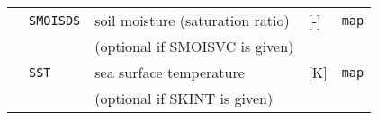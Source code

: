 {\begin{table}[bth]
\begin{center}
\begin{tabularx}{150mm}{rl|l|l|X}
           &\verb|SMOISDS| & soil moisture (saturation ratio) & [-]            & \verb|map|         \\
           &               & (optional if SMOISVC is given)   &                &                    \\
           &\verb|SST|     & sea surface temperature          & [K]            & \verb|map|         \\
           &               & (optional if SKINT is given)     &                &                    \\\hline
\end{tabularx}
\end{center}
\end{table}
}
